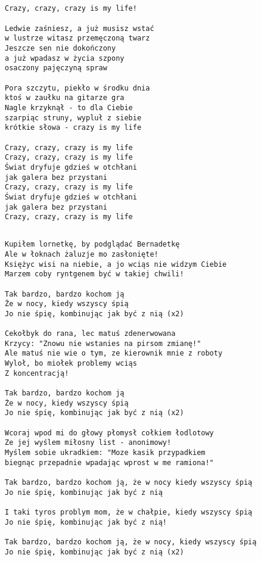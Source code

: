 \documentclass[12pt]{article}
\begin{document}

\subsection*{}
\begin{verbatim}
Crazy, crazy, crazy is my life!

Ledwie zaśniesz, a już musisz wstać
w lustrze witasz przemęczoną twarz
Jeszcze sen nie dokończony
a już wpadasz w życia szpony
osaczony pajęczyną spraw

Pora szczytu, piekło w środku dnia
ktoś w zaułku na gitarze gra
Nagle krzyknął - to dla Ciebie
szarpiąc struny, wypluł z siebie
krótkie słowa - crazy is my life

Crazy, crazy, crazy is my life
Crazy, crazy, crazy is my life
Świat dryfuje gdzieś w otchłani
jak galera bez przystani
Crazy, crazy, crazy is my life
Świat dryfuje gdzieś w otchłani
jak galera bez przystani
Crazy, crazy, crazy is my life
\end{verbatim}
\clearpage

\subsection*{}
\begin{verbatim}
Kupiłem lornetkę, by podglądać Bernadetkę
Ale w łoknach żaluzje mo zasłonięte!
Księżyc wisi na niebie, a jo wciąs nie widzym Ciebie
Marzem coby ryntgenem być w takiej chwili!

Tak bardzo, bardzo kochom ją
Że w nocy, kiedy wszyscy śpią
Jo nie śpię, kombinując jak być z nią (x2)

Cekołbyk do rana, lec matuś zdenerwowana
Krzycy: "Znowu nie wstanies na pirsom zmianę!"
Ale matuś nie wie o tym, ze kierownik mnie z roboty
Wyloł, bo miołek problemy wciąs
Z koncentracją!

Tak bardzo, bardzo kochom ją
Że w nocy, kiedy wszyscy śpią
Jo nie śpię, kombinując jak być z nią (x2)

Wcoraj wpod mi do głowy płomysł cołkiem łodlotowy
Ze jej wyślem miłosny list - anonimowy!
Myślem sobie ukradkiem: "Moze kasik przypadkiem
biegnąc przepadnie wpadając wprost w me ramiona!"

Tak bardzo, bardzo kochom ją, że w nocy kiedy wszyscy śpią
Jo nie śpię, kombinując jak być z nią

I taki tyros problym mom, że w chałpie, kiedy wszyscy śpią
Jo nie śpię, kombinując jak być z nią!

Tak bardzo, bardzo kochom ją, że w nocy, kiedy wszyscy śpią
Jo nie śpię, kombinując jak być z nią (x2)
\end{verbatim}
\clearpage
\end{document}
